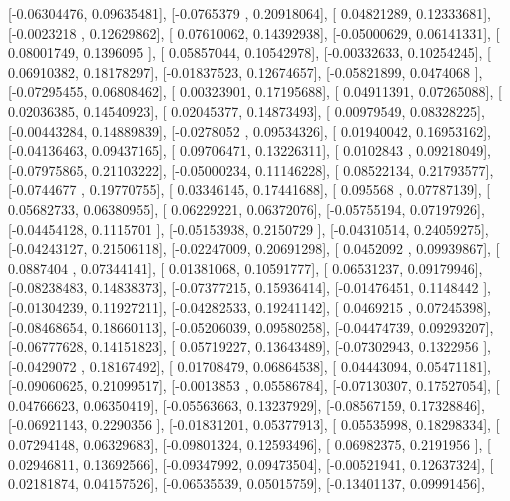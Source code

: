 \documentclass{article}
\begin{document}
       [-0.06304476,  0.09635481],
       [-0.0765379 ,  0.20918064],
       [ 0.04821289,  0.12333681],
       [-0.0023218 ,  0.12629862],
       [ 0.07610062,  0.14392938],
       [-0.05000629,  0.06141331],
       [ 0.08001749,  0.1396095 ],
       [ 0.05857044,  0.10542978],
       [-0.00332633,  0.10254245],
       [ 0.06910382,  0.18178297],
       [-0.01837523,  0.12674657],
       [-0.05821899,  0.0474068 ],
       [-0.07295455,  0.06808462],
       [ 0.00323901,  0.17195688],
       [ 0.04911391,  0.07265088],
       [ 0.02036385,  0.14540923],
       [ 0.02045377,  0.14873493],
       [ 0.00979549,  0.08328225],
       [-0.00443284,  0.14889839],
       [-0.0278052 ,  0.09534326],
       [ 0.01940042,  0.16953162],
       [-0.04136463,  0.09437165],
       [ 0.09706471,  0.13226311],
       [ 0.0102843 ,  0.09218049],
       [-0.07975865,  0.21103222],
       [-0.05000234,  0.11146228],
       [ 0.08522134,  0.21793577],
       [-0.0744677 ,  0.19770755],
       [ 0.03346145,  0.17441688],
       [ 0.095568  ,  0.07787139],
       [ 0.05682733,  0.06380955],
       [ 0.06229221,  0.06372076],
       [-0.05755194,  0.07197926],
       [-0.04454128,  0.1115701 ],
       [-0.05153938,  0.2150729 ],
       [-0.04310514,  0.24059275],
       [-0.04243127,  0.21506118],
       [-0.02247009,  0.20691298],
       [ 0.0452092 ,  0.09939867],
       [ 0.0887404 ,  0.07344141],
       [ 0.01381068,  0.10591777],
       [ 0.06531237,  0.09179946],
       [-0.08238483,  0.14838373],
       [-0.07377215,  0.15936414],
       [-0.01476451,  0.1148442 ],
       [-0.01304239,  0.11927211],
       [-0.04282533,  0.19241142],
       [ 0.0469215 ,  0.07245398],
       [-0.08468654,  0.18660113],
       [-0.05206039,  0.09580258],
       [-0.04474739,  0.09293207],
       [-0.06777628,  0.14151823],
       [ 0.05719227,  0.13643489],
       [-0.07302943,  0.1322956 ],
       [-0.0429072 ,  0.18167492],
       [ 0.01708479,  0.06864538],
       [ 0.04443094,  0.05471181],
       [-0.09060625,  0.21099517],
       [-0.0013853 ,  0.05586784],
       [-0.07130307,  0.17527054],
       [ 0.04766623,  0.06350419],
       [-0.05563663,  0.13237929],
       [-0.08567159,  0.17328846],
       [-0.06921143,  0.2290356 ],
       [-0.01831201,  0.05377913],
       [ 0.05535998,  0.18298334],
       [ 0.07294148,  0.06329683],
       [-0.09801324,  0.12593496],
       [ 0.06982375,  0.2191956 ],
       [ 0.02946811,  0.13692566],
       [-0.09347992,  0.09473504],
       [-0.00521941,  0.12637324],
       [ 0.02181874,  0.04157526],
       [-0.06535539,  0.05015759],
       [-0.13401137,  0.09991456],
\end{document}
